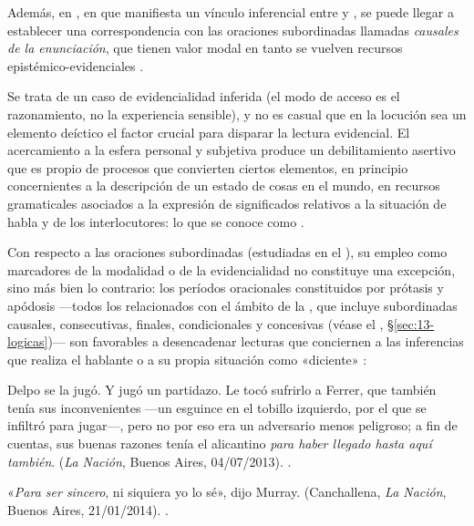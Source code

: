 Además, en , en que  manifiesta un vínculo
inferencial entre  y , se puede llegar a establecer una correspondencia con las oraciones
subordinadas llamadas \textit{causales de la enunciación}, que tienen valor modal
en tanto se vuelven recursos epistémico-evidenciales 
\parencite{marcovecchio2001}.

Se trata de un caso de evidencialidad inferida (el modo de acceso es el
razonamiento, no la experiencia sensible), y no es casual que en la locución
 sea un elemento deíctico el factor crucial para disparar la
lectura evidencial. El acercamiento a la esfera personal y subjetiva produce un
debilitamiento asertivo que es propio de procesos que convierten ciertos
elementos, en principio concernientes a la descripción de un estado de cosas en
el mundo, en recursos gramaticales asociados a la expresión de significados
relativos a la situación de habla y de los interlocutores: lo que se conoce como
.

Con respecto a las oraciones subordinadas (estudiadas en el ), su
empleo como marcadores de la modalidad o de la evidencialidad no constituye una
excepción, sino más bien lo contrario: los períodos oracionales constituidos por
prótasis y apódosis ---todos los relacionados con el ámbito de la
, que incluye subordinadas causales, consecutivas, finales,
condicionales y concesivas (véase el ,
§\ref{sec:13-logicas})--- son favorables a desencadenar lecturas que conciernen a
las inferencias que realiza el hablante  o a su propia
situación como «diciente» 
\parencite{kovacci1992,marcovecchio2016}:

\begin{exe}
  \ex\label{ex:14-delpo}
    \begin{xlist}
      \ex Delpo se la jugó. Y jugó un partidazo. Le tocó sufrirlo a Ferrer, que
          también tenía sus inconvenientes ---un esguince en el tobillo
          izquierdo, por el que se infiltró para jugar---, pero no por eso era un
          adversario menos peligroso; a fin de cuentas, sus buenas razones tenía
          el alicantino \textit{para haber llegado hasta aquí también}.
          (\textit{La Nación}, Buenos Aires, 04/07/2013).
      \ex {}.
    \end{xlist}
  \ex\label{ex:14-murray}
    \begin{xlist}
      \ex «\textit{Para ser sincero}, ni siquiera yo lo sé», dijo Murray.
          (Canchallena, \textit{La Nación}, Buenos Aires, 21/01/2014).
      \ex {}.
    \end{xlist}
\end{exe}

